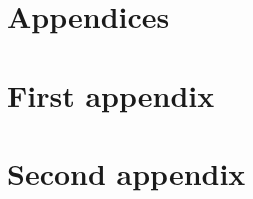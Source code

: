 \documentclass{article}
\begin{document}


\appendix
{}
\section*{Appendices}
\section{First appendix}
\section{Second appendix}




%         

%
%
\newpage

\end{document}

